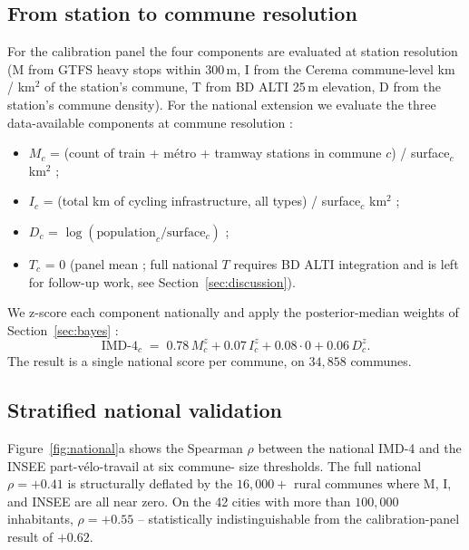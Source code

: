 \documentclass[11pt,a4paper]{article}
\newcommand{\IMD}{\mathrm{IMD}}
\begin{document}
\subsection{From station to commune resolution}

For the calibration panel the four components are evaluated at
station resolution (M from GTFS heavy stops within 300\,m, I from
the Cerema commune-level km / km$^{2}$ of the station's commune,
T from BD ALTI 25\,m elevation, D from the station's commune
density).  For the national extension we evaluate the three
data-available components at commune resolution :
\begin{itemize}[label=$\bullet$,leftmargin=*]
    \item $M_c$ = (count of train + m\'etro + tramway stations in
          commune $c$) / surface$_c$ km$^{2}$ ;
    \item $I_c$ = (total km of cycling infrastructure, all types)
          / surface$_c$ km$^{2}$ ;
    \item $D_c$ = $\log(\text{population}_c / \text{surface}_c)$ ;
    \item $T_c$ = $0$ (panel mean ; full national $T$ requires
          BD ALTI integration and is left for follow-up work, see
          Section~\ref{sec:discussion}).
\end{itemize}

We z-score each component nationally and apply the
posterior-median weights of Section~\ref{sec:bayes} :
\[
    \IMD\text{-}4_c \;=\; 0.78\, M_c^{z} + 0.07\, I_c^{z} + 0.08 \cdot 0 + 0.06\, D_c^{z}.
\]
The result is a single national score per commune, on $34{,}858$
communes.

\subsection{Stratified national validation}

Figure~\ref{fig:national}a shows the Spearman $\rho$ between the
national IMD-4 and the INSEE part-v\'elo-travail at six commune-
size thresholds.  The full national $\rho = +0.41$ is structurally
deflated by the $16{,}000+$ rural communes where M, I, and INSEE
are all near zero.  On the 42 cities with more than $100{,}000$
inhabitants, $\rho = +0.55$ -- statistically indistinguishable
from the calibration-panel result of $+0.62$.
\end{document}
